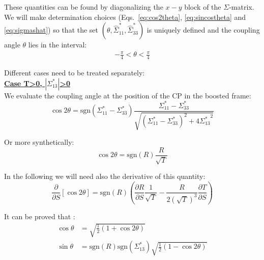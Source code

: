 These quantities can be found by diagonalizing the $x-y$ block of the $\Sigma$-matrix.
We will make determination choices (Eqs.~\ref{eq:cos2theta}, \ref{eq:sincostheta} and \ref{eq:sigmashat}) so that the set $(\theta, \hat{\Sigma}^*_{11}, \hat{\Sigma}^*_{33})$ is uniquely defined and the coupling angle $\theta$ lies in the interval:
\begin{align}
-\frac{\pi}{4}<\theta<\frac{\pi}{4}
\end{align}

Different cases need to be treated separately:
~\\

\textbf{\underline{Case T>0, $\left|\Sigma^*_{13}\right|$>0}}
~\\

We evaluate the coupling angle at the position of the CP in the boosted frame:
\begin{equation}
\cos 2\theta = \textrm{sgn} \left(\Sigma^*_{11} - \Sigma^*_{33}\right)\frac{\Sigma^*_{11} - \Sigma^*_{33}}{\sqrt{\left(\Sigma^*_{11} - \Sigma^*_{33}\right)^2 + 4 {\Sigma^*_{13}}^2 }}
\end{equation}

Or more synthetically:
\begin{equation}
\cos 2\theta = \textrm{sgn}(R)\frac{R}{\sqrt{T}}
\label{eq:cos2theta}
\end{equation}

In the following we will need also the derivative of this quantity:
\begin{equation}
\frac{\partial }{\partial S} \left[ \cos 2\theta \right] =  \textrm{sgn}(R)
\left(\frac{\partial R}{\partial S} \frac{1}{\sqrt{T}}-\frac{R}{2\left( \sqrt{T}\right)^3}\frac{\partial T}{\partial S}\right)
\end{equation}

It can be proved that \cite{refpaper}:
\begin{align}
\cos \theta &= \sqrt{\frac{1}{2}\left(1 + \cos 2\theta \right)}\\
\sin \theta &= \textrm{sgn}(R)\textrm{sgn}(\Sigma^*_{13}) \sqrt{\frac{1}{2}\left(1 - \cos 2\theta \right)}
\label{eq:sincostheta}
\end{align}

~\\

